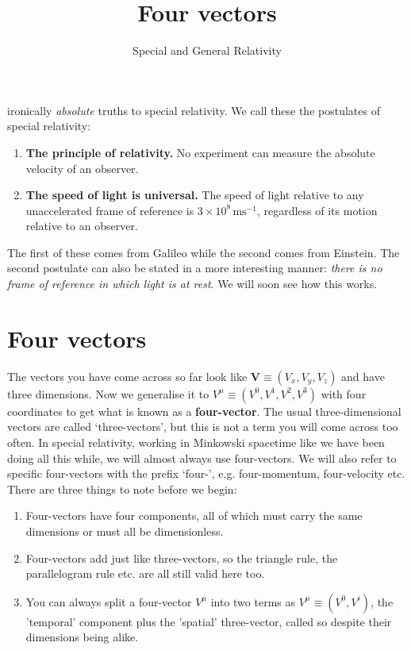 \documentclass[english,seminar]{lecture}
\title{Four vectors}
\subtitle{Special and General Relativity}
\begin{document}
\noindent\noindent{} ironically \textit{absolute} truths to special relativity. We call these the postulates of special relativity:
\begin{enumerate}
	\item{\textbf{The principle of relativity.}} No experiment can measure the absolute velocity of an observer.
	\item{\textbf{The speed of light is universal.}} The speed of light relative to any unaccelerated frame of reference is $3\times 10^8\,\textrm{ms}^{-1}$, regardless of its motion relative to an observer.
\end{enumerate}
The first of these comes from Galileo while the second comes from Einstein. The second postulate can also be stated in a more interesting manner: \textit{there is no frame of reference in which light is at rest}. We will soon see how this works.

\section{Four vectors}

The vectors you have come across so far look like $\mathbf{V} \equiv (V_x, V_y, V_z)$ and have three dimensions. Now we generalise it to $V^\mu \equiv (V^0, V^1, V^2, V^3)$ with four coordinates to get what is known as a \textbf{four-vector}. The usual three-dimensional vectors are called `three-vectors', but this is not a term you will come across too often. In special relativity, working in Minkowski spacetime like we have been doing all this while, we will almost always use four-vectors. We will also refer to specific four-vectors with the prefix `four-', e.g. four-momentum, four-velocity etc. There are three things to note before we begin:
\begin{enumerate}
	\item Four-vectors have four components, all of which must carry the same dimensions or must all be dimensionless.
	\item Four-vectors add just like three-vectors, so the triangle rule, the parallelogram rule etc. are all still valid here too.
	\item You can always split a four-vector $V^\mu$ into two terms as $V^\mu \equiv (V^0, V^i)$, the 'temporal' component plus the 'spatial' three-vector, called so despite their dimensions being alike.
\end{enumerate}
\end{document}
